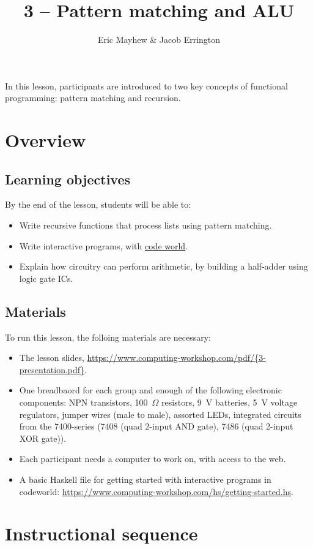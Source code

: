 \documentclass[11pt]{article}
\title{3 -- Pattern matching and ALU}
\author{Eric Mayhew \& Jacob Errington}
\date{}
\newcommand{\cwurl}{https://www.computing-workshop.com/}
\newcommand{\cwpdf}{\cwurl pdf/}
\newcommand{\bootstrapurl}{\url{\cwurl hs/getting-started.hs}}
\newcommand{\codeworld}{\href{http://code.world/}{code world}}
\begin{document}
\maketitle

In this lesson, participants are introduced to two key concepts of functional
programming: pattern matching and recursion.

\section*{Overview}

\subsection*{Learning objectives}

By the end of the lesson, students will be able to:
%
\begin{itemize}
\item Write recursive functions that process lists using pattern matching.
\item Write interactive programs, with \codeworld.
\item Explain how circuitry can perform arithmetic, by building a half-adder
  using logic gate ICs.
\end{itemize}

\subsection*{Materials}

To run this lesson, the folloing materials are necessary:

\begin{itemize}
\item The lesson slides, \url{\cwpdf{3-presentation.pdf}}.
\item One breadbaord for each group and enough of the following electronic components:
  NPN transistors,
  100~$\Omega$ resistors,
  9~V batteries,
  5~V voltage regulators,
  jumper wires (male to male),
  assorted LEDs,
  integrated circuits from the 7400-series (7408 (quad 2-input AND gate), 7486
  (quad 2-input XOR gate)).
\item Each participant needs a computer to work on, with access to the web.
\item A basic Haskell file for getting started with interactive programs in
  codeworld: \bootstrapurl.
\end{itemize}

\section*{Instructional sequence}
\end{document}
